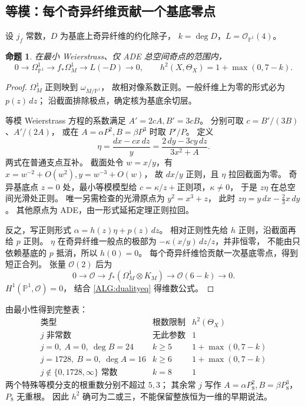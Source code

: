 \documentclass[UTF8,fontset=fandol,zihao=-4,oneside,openany]{ctexbook}
\theoremstyle{cjkplain}
\newtheorem{proposition}[theorem]{命题}
\numberwithin{equation}{chapter}
\begin{document}
\subsection{等模：每个奇异纤维贡献一个基底零点}

设 $j_f$ 常数，$D$ 为基底上奇异纤维的约化除子，
$k=\deg D$，$L=\mathcal O_{\mathbb P^1}(4)$。
\begin{proposition}
\label{ALG:isotrivial}
在最小 Weierstrass、仅 ADE 总空间奇点的范围内，
\begin{equation}
0\to\Omega_{\mathbb P^1}^1\to f_*\Omega_M^1\to L(-D)\to0,
\qquad
h^2(X,\Theta_X)=1+\max(0,7-k).
\label{ALG:isodim}
\end{equation}
\end{proposition}
\begin{proof}
$\Omega_M^1$ 正则映到 $\omega_{M/\mathbb P^1}$，
故相对像系数正则。一般纤维上为零的形式必为 $p(z)\,dz$；
沿截面排除极点，确定核为基底余切层。

等模 Weierstrass 方程的系数满足
$A'=2cA,B'=3cB$。
分别可取 $c=B'/(3B)$、$A'/(2A)$，
或在 $A=\alpha P^2,B=\beta P^3$ 时取 $P'/P$。
定义
\begin{equation}
\eta=\frac{dx-cx\,dz}{y}
=\frac{2\,dy-3cy\,dz}{3x^2+A}.
\label{ALG:eta}
\end{equation}
两式在普通支点互补。
截面处令 $w=x/y$，有 $x=w^{-2}+O(w^2),y=w^{-3}+O(w)$，
故 $dx/y$ 正则，且 $\eta$ 拉回截面为零。
奇异基底点 $z=0$ 处，最小等模模型给
$c=\kappa/z+\text{正则项}$，$\kappa\ne0$，
于是 $z\eta$ 在总空间光滑处正则。
唯一另需检查的光滑原点为 $y^2=x^3+z$，
此时 $z\eta=y\,dx-\frac23x\,dy$。
其他原点为 ADE，由一形式延拓定理正则拉回。

反之，写正则形式 $\alpha=h(z)\eta+p(z)\,dz$。
相对正则性先给 $h$ 正则，沿截面再给 $p$ 正则。
$\eta$ 在奇异纤维一般点的极部为
$-\kappa(x/y)\,dz/z$，并非恒零，
不能由只依赖基底的 $p$ 抵消，所以 $h(0)=0$。
每个奇异纤维恰贡献一次基底零点，得到短正合列。
张量 $\mathcal O(2)$ 后为
\[
0\to\mathcal O\to f_*(\Omega_M^1\otimes K_M)\to\mathcal O(6-k)\to0.
\]
$H^1(\mathbb P^1,\mathcal O)=0$，
结合 \eqref{ALG:dualityeq} 得维数公式。
\end{proof}

由最小性得到完整表：
\[
\begin{array}{c|c|c}
\text{类型}&\text{根数限制}&h^2(\Theta_X)\\ \hline
j\text{ 非常数}&\text{无此参数}&1\\
j=0,\ A=0,\ \deg B=24&k\ge5&1+\max(0,7-k)\\
j=1728,\ B=0,\ \deg A=16&k\ge6&1+\max(0,7-k)\\
j\notin\{0,1728,\infty\}\text{ 常数}&k=8&1
\end{array}
\]
两个特殊等模分支的根重数分别不超过 $5,3$；
其余常 $j$ 写作 $A=\alpha P_8^2,B=\beta P_8^3$，$P_8$ 无重根。
因此 $h^2$ 确可为二或三，不能保留整族恒为一维的早期说法。
\end{document}
